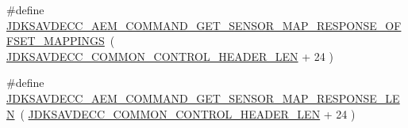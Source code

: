 \begin{DoxyCompactItemize}
\item 
\#define \hyperlink{group__command__get__sensor__map__response_ga55bb0200014cefca99f8d45378e71aca}{J\+D\+K\+S\+A\+V\+D\+E\+C\+C\+\_\+\+A\+E\+M\+\_\+\+C\+O\+M\+M\+A\+N\+D\+\_\+\+G\+E\+T\+\_\+\+S\+E\+N\+S\+O\+R\+\_\+\+M\+A\+P\+\_\+\+R\+E\+S\+P\+O\+N\+S\+E\+\_\+\+O\+F\+F\+S\+E\+T\+\_\+\+M\+A\+P\+P\+I\+N\+GS}~( \hyperlink{group__jdksavdecc__avtp__common__control__header_gaae84052886fb1bb42f3bc5f85b741dff}{J\+D\+K\+S\+A\+V\+D\+E\+C\+C\+\_\+\+C\+O\+M\+M\+O\+N\+\_\+\+C\+O\+N\+T\+R\+O\+L\+\_\+\+H\+E\+A\+D\+E\+R\+\_\+\+L\+EN} + 24 )
\item 
\#define \hyperlink{group__command__get__sensor__map__response_ga14b166ca3e73b9e45243bf631064589c}{J\+D\+K\+S\+A\+V\+D\+E\+C\+C\+\_\+\+A\+E\+M\+\_\+\+C\+O\+M\+M\+A\+N\+D\+\_\+\+G\+E\+T\+\_\+\+S\+E\+N\+S\+O\+R\+\_\+\+M\+A\+P\+\_\+\+R\+E\+S\+P\+O\+N\+S\+E\+\_\+\+L\+EN}~( \hyperlink{group__jdksavdecc__avtp__common__control__header_gaae84052886fb1bb42f3bc5f85b741dff}{J\+D\+K\+S\+A\+V\+D\+E\+C\+C\+\_\+\+C\+O\+M\+M\+O\+N\+\_\+\+C\+O\+N\+T\+R\+O\+L\+\_\+\+H\+E\+A\+D\+E\+R\+\_\+\+L\+EN} + 24 )
\end{DoxyCompactItemize}
